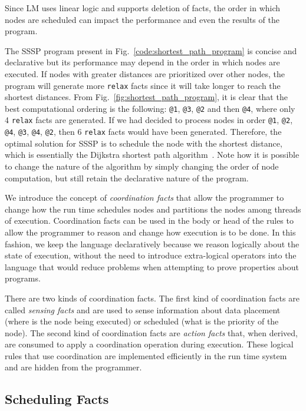 Since LM uses linear logic and supports deletion of facts, the order in which
nodes are scheduled can impact the performance and even the results of the
program.

The SSSP program present in Fig.~\ref{code:shortest_path_program} is concise and
declarative but its performance may depend in the order in which nodes are
executed. If nodes with greater distances are prioritized over other nodes, the
program will generate more \texttt{relax} facts since it will take longer to
reach the shortest distances. From Fig.~\ref{fig:shortest_path_program}, it is
clear that the best computational ordering is the following: \texttt{@1},
\texttt{@3}, \texttt{@2} and then \texttt{@4}, where only 4 \texttt{relax}
facts are generated. If we had decided to process nodes in order
\texttt{@1}, \texttt{@2}, \texttt{@4}, \texttt{@3}, \texttt{@4},
\texttt{@2}, then 6 \texttt{relax} facts would have been generated.
Therefore, the optimal solution for SSSP is to schedule the node with the
shortest distance, which is essentially the Dijkstra shortest path
algorithm~\cite{Dijkstra}. Note how it is possible to change the nature of
the algorithm by simply changing the order of node computation, but still
retain the declarative nature of the program.

We introduce the concept of \emph{coordination facts} that allow the programmer
to change how the run time schedules nodes and partitions the nodes among
threads of execution. Coordination facts can be used in the body or head of the
rules to allow the programmer to reason and change how execution is to be done.
In this fashion, we keep the language declaratively because we reason logically
about the state of execution, without the need to introduce extra-logical
operators into the language that would reduce problems when attempting to prove
properties about programs.

There are two kinds of coordination facts. The first kind of coordination facts are
called \emph{sensing facts} and are used to sense information about data
placement (where is the node being executed) or scheduled (what is the priority
of the node). The second kind of coordination facts are \emph{action facts} that,
when derived, are consumed to apply a coordination operation during execution.
These logical rules that use coordination are implemented efficiently in the run
time system and are hidden from the programmer.

\subsection{Scheduling Facts}

